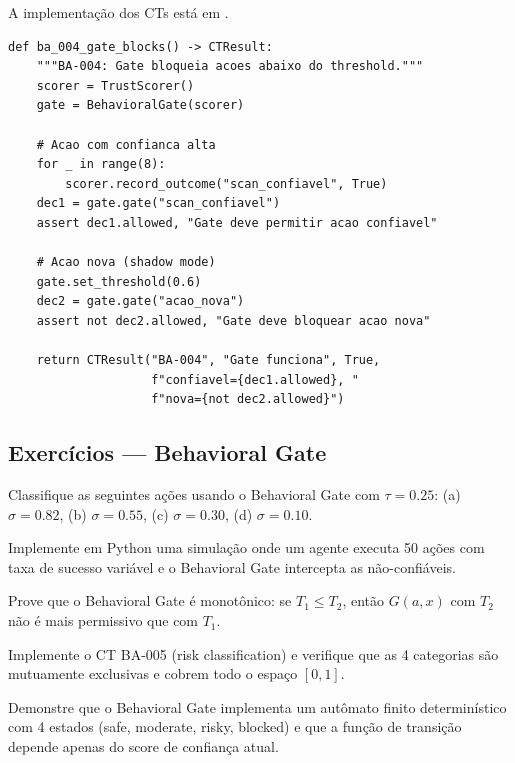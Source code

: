 A implementação dos CTs está em
.

\begin{lstlisting}[style=pythonstyle, caption={CTs de validacao do Behavioral Gate (test\_behavioral\_autonomy.py)}]
def ba_004_gate_blocks() -> CTResult:
    """BA-004: Gate bloqueia acoes abaixo do threshold."""
    scorer = TrustScorer()
    gate = BehavioralGate(scorer)

    # Acao com confianca alta
    for _ in range(8):
        scorer.record_outcome("scan_confiavel", True)
    dec1 = gate.gate("scan_confiavel")
    assert dec1.allowed, "Gate deve permitir acao confiavel"

    # Acao nova (shadow mode)
    gate.set_threshold(0.6)
    dec2 = gate.gate("acao_nova")
    assert not dec2.allowed, "Gate deve bloquear acao nova"

    return CTResult("BA-004", "Gate funciona", True,
                    f"confiavel={dec1.allowed}, "
                    f"nova={not dec2.allowed}")
\end{lstlisting}

\subsection{Exercícios — Behavioral Gate}
\begin{exercicio}
Classifique as seguintes ações usando o Behavioral Gate com
$\tau = 0.25$: (a) $\sigma = 0.82$, (b) $\sigma = 0.55$,
(c) $\sigma = 0.30$, (d) $\sigma = 0.10$.
\end{exercicio}
\begin{exercicio}
Implemente em Python uma simulação onde um agente executa 50 ações
com taxa de sucesso variável e o Behavioral Gate intercepta as
não-confiáveis.
\end{exercicio}
\begin{exercicio}
Prove que o Behavioral Gate é monotônico: se $T_1 \leq T_2$, então
$G(a, x)$ com $T_2$ não é mais permissivo que com $T_1$.
\end{exercicio}
\begin{exercicio}
Implemente o CT BA-005 (risk classification) e verifique que as 4
categorias são mutuamente exclusivas e cobrem todo o espaço $[0,1]$.
\end{exercicio}
\begin{exercicio}
Demonstre que o Behavioral Gate implementa um autômato finito
determinístico com 4 estados (safe, moderate, risky, blocked) e que
a função de transição depende apenas do score de confiança atual.
\end{exercicio}

